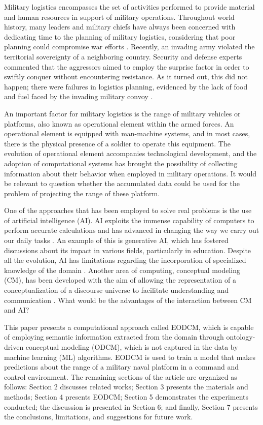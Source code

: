 \documentclass[
]{ceurart}
\begin{document}
Military logistics encompasses the set of activities performed to provide material and human resources in support of military operations. Throughout world history, many leaders and military chiefs have always been concerned with dedicating time to the planning of military logistics, considering that poor planning could compromise war efforts \cite{simon2001art}. Recently, an invading army violated the territorial sovereignty of a neighboring country. Security and defense experts commented that the aggressors aimed to employ the surprise factor in order to swiftly conquer without encountering resistance. As it turned out, this did not happen; there were failures in logistics planning, evidenced by the lack of food and fuel faced by the invading military convoy \cite{comboio2023reportagem}.
\par An important factor for military logistics is the range of military vehicles or platforms, also known as operational element within the armed forces. An operational element is equipped with man-machine systems, and in most cases, there is the physical presence of a soldier to operate this equipment. The evolution of operational element accompanies technological development, and the adoption of computational systems has brought the possibility of collecting information about their behavior when employed in military operations. It would be relevant to question whether the accumulated data could be used for the problem of projecting the range of these platform.
\par One of the approaches that has been employed to solve real problems is the use of artificial intelligence (AI). AI exploits the immense capability of computers to perform accurate calculations and has advanced in changing the way we carry out our daily tasks \cite{russell2013IA}. An example of this is generative AI, which has fostered discussions about its impact in various fields, particularly in education. Despite all the evolution, AI has limitations regarding the incorporation of specialized knowledge of the domain \cite{bork2023conceptual}. Another area of computing, conceptual modeling (CM), has been developed with the aim of allowing the representation of a conceptualization of a discourse universe to facilitate understanding and communication \cite{mylopoulos1992conceptual}. What would be the advantages of the interaction between CM and AI?
\par This paper presents a computational approach called EODCM, which is capable of employing semantic information extracted from the domain through ontology-driven conceptual modeling (ODCM), which is not captured in the data by machine learning (ML) algorithms. EODCM is used to train a model that makes predictions about the range of a military naval platform in a command and control environment. The remaining sections of the article are organized as follows: Section 2 discusses related works; Section 3 presents the materials and methods; Section 4 presents EODCM; Section 5 demonstrates the experiments conducted; the discussion is presented in Section 6; and finally, Section 7 presents the conclusions, limitations, and suggestions for future work.
\end{document}
